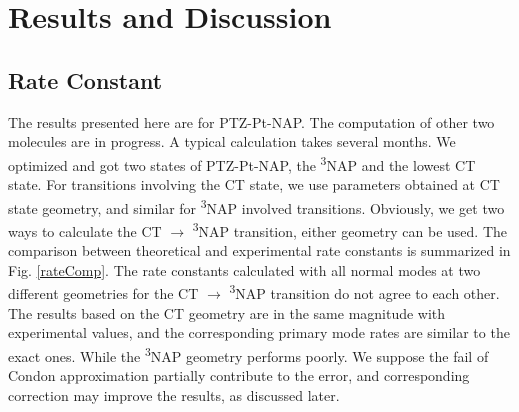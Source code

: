


\section{Results and Discussion} %

\subsection{Rate Constant}
The results presented here are for PTZ-Pt-NAP. The computation of other two molecules are in progress. A typical calculation takes several months. We optimized and got two states of PTZ-Pt-NAP, the \textsuperscript{3}NAP and the lowest CT state. For transitions involving the CT state, we use parameters obtained at CT state geometry, and similar for \textsuperscript{3}NAP involved transitions. Obviously, we get two ways to calculate the CT $\rightarrow$ \textsuperscript{3}NAP transition, either geometry can be used. The comparison between theoretical and experimental rate constants is summarized in Fig. \ref{rateComp}. The rate constants calculated with all normal modes at two different geometries for the CT $\rightarrow$ \textsuperscript{3}NAP transition do not agree to each other. The results based on the CT geometry are in the same magnitude with experimental values, and the corresponding primary mode rates are similar to the exact ones. While the \textsuperscript{3}NAP geometry performs poorly. We suppose the fail of Condon approximation partially contribute to the error, and corresponding correction may improve the results, as discussed later.

